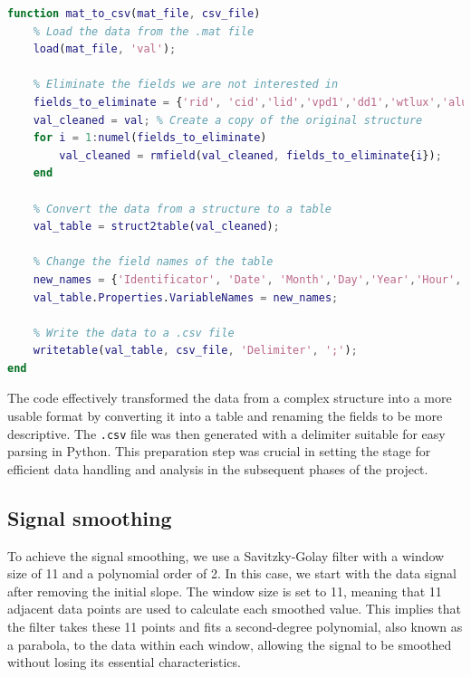 \begin{lstlisting}[language=Matlab,caption={MATLAB function to convert .mat file to .csv}, label=lst:mat_to_csv]
function mat_to_csv(mat_file, csv_file)
    % Load the data from the .mat file
    load(mat_file, 'val');
    
    % Eliminate the fields we are not interested in
    fields_to_eliminate = {'rid', 'cid','lid','vpd1','dd1','wtlux','alux','ecb1','ecp1','st2', 'p2', 'ec2', 'vwc2', 'ecb2', 'ecp2', 'st3', 'p3', 'ec3', 'vwc3', 'ecb3', 'ecp3','par','dli'};
    val_cleaned = val; % Create a copy of the original structure
    for i = 1:numel(fields_to_eliminate)
        val_cleaned = rmfield(val_cleaned, fields_to_eliminate{i});
    end
    
    % Convert the data from a structure to a table
    val_table = struct2table(val_cleaned);
    
    % Change the field names of the table
    new_names = {'Identificator', 'Date', 'Month','Day','Year','Hour','Minute','Second','Temperature','Relative_humidity', 'Light', 'Soil_temperature', 'Permittivity', 'Electroconductivity', 'Volumetric_water_content', 'Diameter', 'Battery_voltage'};
    val_table.Properties.VariableNames = new_names;
    
    % Write the data to a .csv file
    writetable(val_table, csv_file, 'Delimiter', ';');
end
\end{lstlisting}

The code effectively transformed the data from a complex structure into a more usable format by converting it into a table and renaming the fields to be more descriptive. The \texttt{.csv} file was then generated with a delimiter suitable for easy parsing in Python. This preparation step was crucial in setting the stage for efficient data handling and analysis in the subsequent phases of the project.

\subsection{Signal smoothing}

To achieve the signal smoothing, we use a Savitzky-Golay filter with a window size of 11 and a polynomial order of 2. In this case, we start with the data signal after removing the initial slope. The window size is set to 11, meaning that 11 adjacent data points are used to calculate each smoothed value. This implies that the filter takes these 11 points and fits a second-degree polynomial, also known as a parabola, to the data within each window, allowing the signal to be smoothed without losing its essential characteristics.

